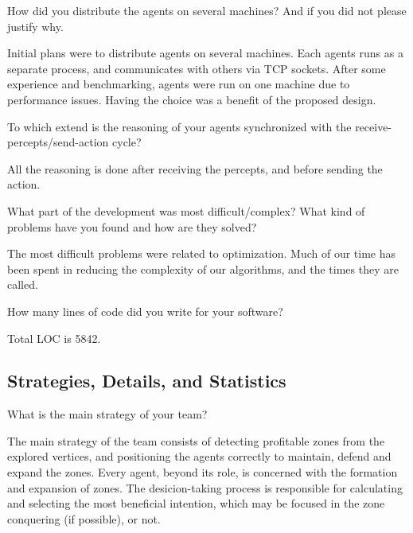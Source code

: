 \begin{question}
How did you distribute the agents on several machines? And if you did not
please justify why.  
\end{question}

Initial plans were to distribute agents on several machines. Each agents runs as
a separate process, and communicates with others via TCP sockets. After some
experience and benchmarking, agents were run on one machine due to performance
issues. Having the choice was a benefit of the proposed design.

\begin{question}
To which extend is the reasoning of your agents synchronized with the
receive-percepts/send-action cycle?
\end{question}

All the reasoning is done after receiving the percepts, and before sending the
action.

\begin{question}
What part of the development was most difficult/complex? What kind of problems
have you found and how are they solved?  
\end{question}

The most difficult problems were related to optimization. Much of our time has
been spent in reducing the complexity of our algorithms, and the times they are
called.

\begin{question}
How many lines of code did you write for your software?  
\end{question}

Total LOC is 5842.

\subsection{Strategies, Details, and Statistics}
\setcounter{question}{0}

\begin{question}
What is the main strategy of your team?
\end{question}

The main strategy of the team consists of detecting profitable zones from the
explored vertices, and positioning the agents correctly to maintain, defend and
expand the zones.  Every agent, beyond its role, is concerned with the formation
and expansion of zones.  The desicion-taking process is responsible for
calculating and selecting the most beneficial intention, which may be focused in
the zone conquering (if possible), or not.
    
